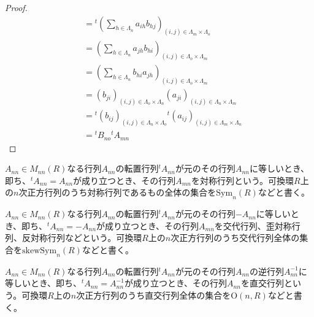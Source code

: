 \documentclass[dvipdfmx]{jsarticle}
\begin{document}
\begin{proof}
\begin{align*}
&={}^{t}\left( \sum_{h \in \varLambda_{n}} {a_{ih}b_{hj}} \right)_{(i,j) \in \varLambda_{m} \times \varLambda_{o}}\\
&= \left( \sum_{h \in \varLambda_{n}} {a_{jh}b_{hi}} \right)_{(i,j) \in \varLambda_{o} \times \varLambda_{m}}\\
&= \left( \sum_{h \in \varLambda_{n}} {b_{hi}a_{jh}} \right)_{(i,j) \in \varLambda_{o} \times \varLambda_{m}}\\
&= \left( b_{ji} \right)_{(i,j) \in \varLambda_{o} \times \varLambda_{n}}\left( a_{ji} \right)_{(i,j) \in \varLambda_{n} \times \varLambda_{m}}\\
&={}^{t}\left( b_{ij} \right)_{(i,j) \in \varLambda_{n} \times \varLambda_{o}}{}^{t}\left( a_{ij} \right)_{(i,j) \in \varLambda_{m} \times \varLambda_{n}}\\
&={}^{t}B_{no}{}^{t}A_{mn}
\end{align*}
\end{proof}
\begin{dfn}
$A_{nn} \in M_{nn}(R)$なる行列$A_{nn}$の転置行列${}^{t}A_{nn}$が元のその行列$A_{nn}$に等しいとき、即ち、${}^{t}A_{nn} = A_{nn}$が成り立つとき、その行列$A_{mn}$を対称行列という。可換環$R$上の$n$次正方行列のうち対称行列であるもの全体の集合を${\mathrm{Sym} }_{n}(R)$などと書く。
\end{dfn}
\begin{dfn}
$A_{nn} \in M_{nn}(R)$なる行列$A_{nn}$の転置行列${}^{t}A_{nn}$が元のその行列$- A_{nn}$に等しいとき、即ち、${}^{t}A_{nn} = - A_{nn}$が成り立つとき、その行列$A_{mn}$を交代行列、歪対称行列、反対称行列などという。可換環$R$上の$n$次正方行列のうち交代行列全体の集合を${\mathrm{skew}}{{\mathrm{Sym} }_{n}(R)}$などと書く。
\end{dfn}
\begin{dfn}
$A_{nn} \in M_{nn}(R)$なる行列$A_{nn}$の転置行列${}^{t}A_{nn}$が元のその行列$A_{nn}$の逆行列$A_{nn}^{- 1}$に等しいとき、即ち、${}^{t}A_{nn} = A_{nn}^{- 1}$が成り立つとき、その行列$A_{nn}$を直交行列という。可換環$R$上の$n$次正方行列のうち直交行列全体の集合を$\mathrm{O} (n,R)$などと書く。
\end{dfn}
\end{document}

